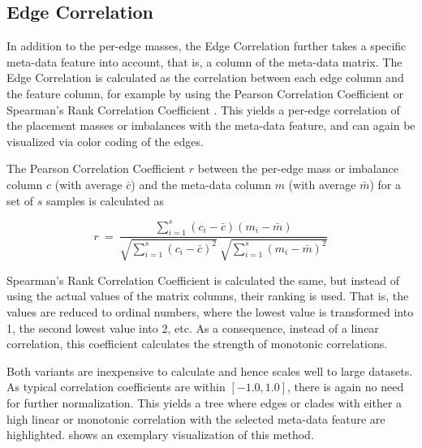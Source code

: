 
\subsection{Edge Correlation}
\label{ch:Visualization:sec:Methods:sub:EdgeCorrelation}

In addition to the per-edge masses, the Edge Correlation further
takes a specific meta-data feature into account, that is, a column of the meta-data matrix.
The Edge Correlation is calculated as the correlation between each edge column and the feature column,
for example by using the Pearson Correlation Coefficient or Spearman's Rank Correlation Coefficient \cite{Everitt2010}.
This yields a per-edge correlation of the placement masses or imbalances with the meta-data feature,
and can again be visualized via color coding of the edges.

The Pearson Correlation Coefficient $r$ between the per-edge mass or imbalance column $c$ (with average $\bar{c}$)
and the meta-data column $m$ (with average $\bar{m}$) for a set of $s$ samples is calculated as

\begin{equation}
    \label{ch:Visualization:eq:PCC}
    r ~=~ \frac{ \sum_{i=1}^{s} (c_i - \bar{c})(m_i - \bar{m}) }{ \sqrt{ \sum_{i=1}^{s} (c_i - \bar{c})^2 } ~ \sqrt{ \sum_{i=1}^{s} (m_i - \bar{m})^2 } }
\end{equation}

Spearman's Rank Correlation Coefficient is calculated the same, but instead of using the actual values
of the matrix columns, their ranking is used.
That is, the values are reduced to ordinal numbers, where the lowest value is transformed into \num{1},
the second lowest value into \num{2}, etc.
As a consequence, instead of a linear correlation, this coefficient calculates the strength of monotonic correlations.

Both variants are inexpensive to calculate and hence scales well to large datasets.
As typical correlation coefficients are within $[ -1.0, 1.0 ]$, there is again no need for further normalization.
This yields a tree where edges or clades with either a high linear or monotonic correlation
with the selected meta-data feature are highlighted.
 shows an exemplary visualization of this method.

